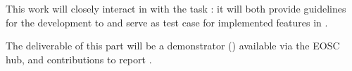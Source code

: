 \begin{task}[
  title=Application: Visualisation and control of fluid dynamics in Jupyter notebook,
  id=application-gpu,
  lead=SIL,
  PM=13,
  wphases={4-36},
  partners={EGI}
]
This work will closely interact in with the task
: it will both provide guidelines
for the development to  and serve
as test case for implemented features in
.

The deliverable of this part will be a demonstrator
() available via the EOSC hub, and
contributions to report .

\end{task}

